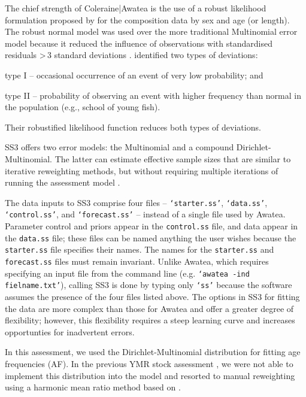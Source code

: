 \documentclass[11pt]{book}
\newcommand{\code}[1]{\normalsize\texttt{#1}\normalsize}%
\begin{document}
The chief strength of Coleraine|Awatea is the use of a robust likelihood formulation proposed by \citet{Fournier-etal:1998} for the composition data by sex and age (or length).
The robust normal model was used over the more traditional Multinomial error model because it reduced the influence of observations with standardised residuals >\,3 standard deviations \citep{Fournier-etal:1990}.
\citet{Fournier-etal:1990} identified two types of deviations:
\begin{itemize_csas}{}{}
	\item type I -- occasional occurrence of an event of very low probability; and
	\item type II -- probability of observing an event with higher frequency than normal in the population (e.g., school of young fish).
\end{itemize_csas}
Their robustified likelihood function reduces both types of deviations.

SS3 offers two error models: the Multinomial and a compound Dirichlet-Multinomial.
The latter can estimate effective sample sizes that are similar to iterative reweighting methods, but without requiring multiple iterations of running the assessment model \citep{Thorson-etal:2017}.

The data inputs to SS3 comprise four files -- \code{`starter.ss'}, \code{`data.ss'}, \code{`control.ss'}, and \code{`forecast.ss'} -- instead of a single file used by Awatea.
Parameter control and priors appear in the \code{control.ss} file, and data appear in the \code{data.ss} file; these files can be named anything the user wishes because the \code{starter.ss} file specifies their names.
The names for the \code{starter.ss} and \code{forecast.ss} files must remain invariant.
Unlike Awatea, which requires specifying an input file from the command line (e.g. \code{`awatea -ind fielname.txt'}), calling SS3 is done by typing only \code{`ss'} because the software assumes the presence of the four files listed above.
The options in SS3 for fitting the data are more complex than those for Awatea and offer a greater degree of flexibility; however, this flexibility requires a steep learning curve and increases opportunties for inadvertent errors.

In this assessment, we used the Dirichlet-Multinomial distribution for fitting age frequencies (AF).
In the previous YMR stock assessment \citep{DFO-SAR:2022_ymr}, we were not able to implement this distribution into the model and resorted to manual reweighting using a harmonic mean ratio method based on \citet{McAllister-Ianelli:1997}.
\end{document}
